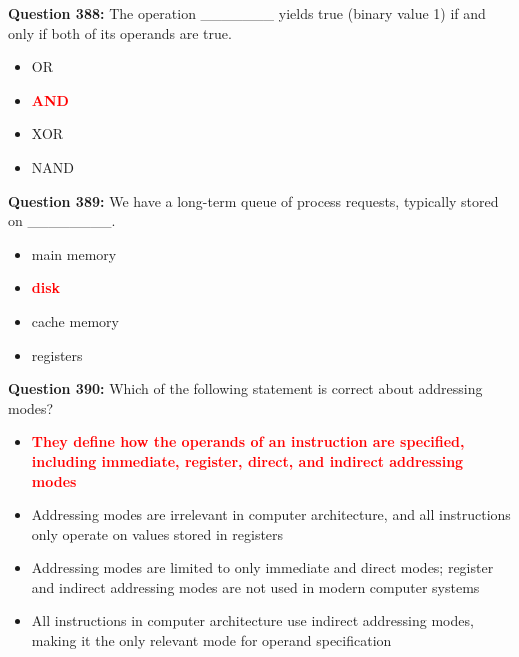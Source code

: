 \documentclass[12pt,a4paper]{article}
\begin{document}
\vspace{0.5cm}

\textbf{Question 388:} The operation _______ yields true (binary value 1) if and only if both of its operands are true.

\begin{itemize}
    \item[\textbf{A.}] OR
    \item[\textbf{B.}] \textcolor{red}{\textbf{AND}}
    \item[\textbf{C.}] XOR
    \item[\textbf{D.}] NAND
\end{itemize}

\vspace{0.5cm}

\textbf{Question 389:} We have a long-term queue of process requests, typically stored on ________.

\begin{itemize}
    \item[\textbf{A.}] main memory
    \item[\textbf{B.}] \textcolor{red}{\textbf{disk}}
    \item[\textbf{C.}] cache memory
    \item[\textbf{D.}] registers
\end{itemize}

\vspace{0.5cm}

\textbf{Question 390:} Which of the following statement is correct about addressing modes?

\begin{itemize}
    \item[\textbf{A.}] \textcolor{red}{\textbf{They define how the operands of an instruction are specified, including immediate, register, direct, and indirect addressing modes}}
    \item[\textbf{B.}] Addressing modes are irrelevant in computer architecture, and all instructions only operate on values stored in registers
    \item[\textbf{C.}] Addressing modes are limited to only immediate and direct modes; register and indirect addressing modes are not used in modern computer systems
    \item[\textbf{D.}] All instructions in computer architecture use indirect addressing modes, making it the only relevant mode for operand specification
\end{itemize}

\vspace{0.5cm}
\end{document}
